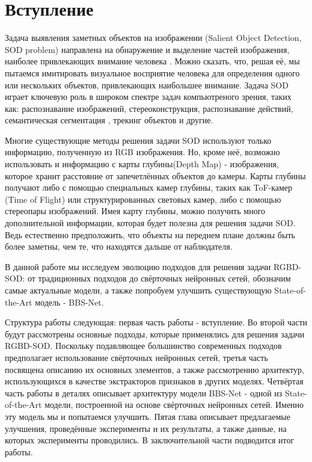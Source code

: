 \section{Вступление}

Задача выявления заметных объектов на изображении (Salient Object Detection, SOD problem) направлена на
 обнаружение и выделение частей изображения, наиболее привлекающих внимание
человека \cite{Is-Depth-Really-Necessary-for-SOD}. Можно сказать, что, решая её, мы пытаемся имитировать визуальное восприятие человека для определения одного 
или нескольких объектов, привлекающих наибольшее внимание. Задача SOD играет ключевую роль в широком спектре задач компьютреного зрения, таких как:
распознавание изображений\cite{Image-Understanding}, стереоконструкция\cite{Stereo-Matching},
распознавание действий\cite{Action-Recognition}, семантическая сегментация \cite{Semantic-Segmentation-1} \cite{Semantic-Segmentation-2},
трекинг объектов\cite{Pattern-Recognition} и другие.

Многие существующие методы решения задачи SOD используют только информацию, полученную из RGB изображения.
Но, кроме неё, возможно использовать и информацию с карты глубины(Depth Map) - изображения, которое хранит расстояние от запечетлённых объектов до камеры.
Карты глубины получают либо с помощью специальных камер глубины, таких как ToF-камер (Time of Flight) или структурированных световых камер, либо с помощью
стереопары изображений. Имея карту глубины, можно получить много дополнительной информации, которая будет полезна для решения задачи SOD. Ведь естественно предположить,
что объекты на переднем плане должны быть более заметны, чем те, что находятся дальше от наблюдателя.

В данной работе мы исследуем эволюцию подходов для решения задачи RGBD-SOD: от традиционных подходов до свёрточных нейронных сетей, обозначим самые актуальные модели, 
а также попробуем улучшить существующую State-of-the-Art модель - BBS-Net\cite{BBS}.

Структура работы следующая: первая часть работы - вступление. Во второй части будут рассмотрены основные подходы, которые применялись для решения задачи RGBD-SOD. Поскольку подавляющее большинство 
современных подходов предполагает использование свёрточных нейронных сетей, третья часть посвящена описанию их основных элементов, а также рассмотрению
архитектур, использующихся в качестве экстракторов признаков в других моделях. Четвёртая часть работы в деталях описывает архитектуру модели BBS-Net\cite{BBS} - одной
из State-of-the-Art модели, построенной на основе свёрточных нейронных сетей. Именно эту модель мы и попытаемся улучшить. Пятая глава
описывает предлагаемые улучшения, проведённые эксперименты и их результаты, 
а также данные, на которых эксперименты проводились. В заключительной части
подводится итог работы. 